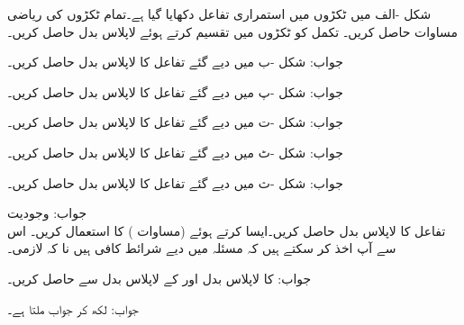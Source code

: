 شکل -الف میں ٹکڑوں میں استمراری تفاعل دکھایا گیا ہے۔تمام ٹکڑوں کی ریاضی مساوات حاصل کریں۔ تکمل   کو ٹکڑوں میں تقسیم کرتے ہوئے لاپلاس بدل حاصل کریں۔

جواب:
شکل -ب میں دیے گئے تفاعل کا لاپلاس بدل حاصل کریں۔

جواب:
شکل -پ میں دیے گئے تفاعل کا لاپلاس بدل حاصل کریں۔

جواب:
شکل -ت میں دیے گئے تفاعل کا لاپلاس بدل حاصل کریں۔

جواب:
شکل -ٹ میں دیے گئے تفاعل کا لاپلاس بدل حاصل کریں۔

جواب:
شکل -ث میں دیے گئے تفاعل کا لاپلاس بدل حاصل کریں۔

جواب:
\quad وجودیت\\
تفاعل  کا لاپلاس بدل حاصل کریں۔ایسا کرتے ہوئے  (مساوات ) کا استعمال کریں۔ اس سے آپ اخذ کر سکتے ہیں کہ مسئلہ  میں دیے شرائط کافی ہیں نا کہ لازمی۔

جواب:
 کا لاپلاس بدل  اور  کے لاپلاس بدل سے حاصل کریں۔

جواب: لکھ کر جواب  ملتا ہے۔
